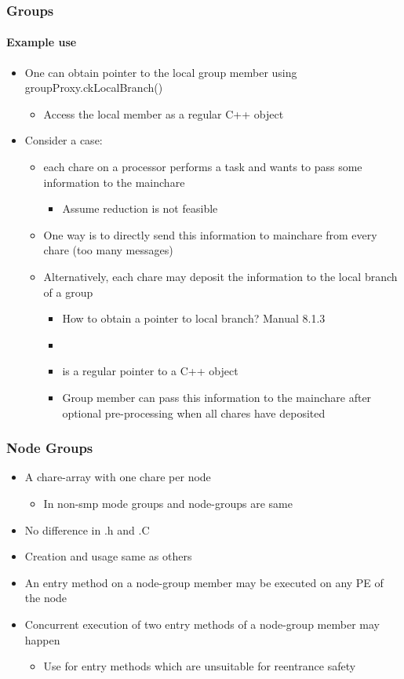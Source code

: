 \begin{frame}[fragile]
  \frametitle{Groups}
  \framesubtitle{Example use}
  \begin{itemize}
    \item  One can obtain pointer to the local group member using groupProxy.ckLocalBranch()
    \begin{itemize}
      \item Access the local member as a regular C++ object
    \end{itemize}
   \item Consider a case:
   \begin{itemize}
      \item each chare on a processor performs a task and wants to pass some information to the mainchare
      \begin{itemize}
         \item Assume reduction is not feasible
      \end{itemize}
      \item One way is to directly send this information to mainchare from every chare (too many messages)
      \item Alternatively, each chare may deposit the information to the local branch of a group
      \begin{itemize}
        \item How to obtain a pointer to local branch? Manual 8.1.3
        \item {}
        \item {} is a regular pointer to a C++ object
        \item Group member can pass this information to the mainchare after optional pre-processing when all chares have deposited 
      \end{itemize}
    \end{itemize}
  \end{itemize}
\end{frame}

\begin{frame}[fragile]
  \frametitle{Node Groups}
  \begin{itemize}
    \item A chare-array with one chare per node
    \begin{itemize}
      \item In non-smp mode groups and node-groups are same
    \end{itemize}
    \item No difference in .h and .C
    \item Creation and usage same as others
    \item An entry method on a node-group member may be executed on any PE of the node
    \item Concurrent execution of two entry methods of a node-group member may happen
    \begin{itemize}
      \item Use \code{[exclusive]} for entry methods which are unsuitable for reentrance safety
    \end{itemize}
  \end{itemize}
\end{frame}

